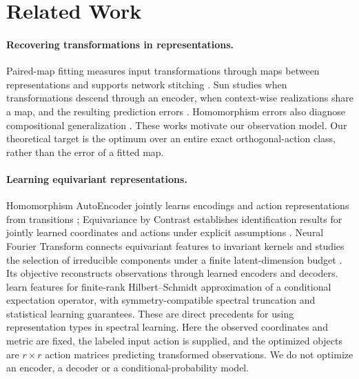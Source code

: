 \section{Related Work}
\label{sec:related-main}
\paragraph{Recovering transformations in representations.}
Paired-map fitting measures input transformations through maps between representations and supports network stitching \citep{lenc2015understanding}. Sun studies when transformations descend through an encoder, when context-wise realizations share a map, and the resulting prediction errors \citep{sun2026transformationlaws}. Homomorphism errors also diagnose compositional generalization \citep{an2026homomorphism}. These works motivate our observation model. Our theoretical target is the optimum over an entire exact orthogonal-action class, rather than the error of a fitted map.

\paragraph{Learning equivariant representations.}
Homomorphism AutoEncoder jointly learns encodings and action representations from transitions \citep{keurti2023homomorphism}; Equivariance by Contrast establishes identification results for jointly learned coordinates and actions under explicit assumptions \citep{schmidt2025equivariance}. Neural Fourier Transform connects equivariant features to invariant kernels and studies the selection of irreducible components under a finite latent-dimension budget \citep{koyama2024fourier}. Its objective reconstructs observations through learned encoders and decoders. \citet{ordonez2026inference} learn features for finite-rank Hilbert--Schmidt approximation of a conditional expectation operator, with symmetry-compatible spectral truncation and statistical learning guarantees. These are direct precedents for using representation types in spectral learning. Here the observed coordinates and metric are fixed, the labeled input action is supplied, and the optimized objects are $r\times r$ action matrices predicting transformed observations. We do not optimize an encoder, a decoder or a conditional-probability model.

